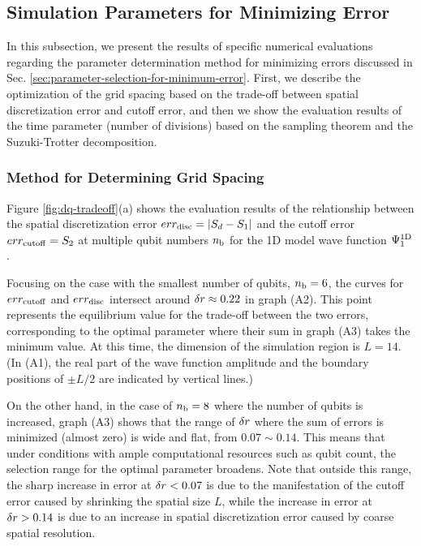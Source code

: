 \documentclass[jctc-draft.tex]{subfiles}
\begin{document}
\subsection{Simulation Parameters for Minimizing Error}
\label{subsec:parameter-selection-for-minimum-error-results}
In this subsection, we present the results of specific numerical evaluations
regarding the parameter determination method for minimizing errors discussed in
Sec. \ref{sec:parameter-selection-for-minimum-error}. First, we describe the
optimization of the grid spacing based on the trade-off between spatial
discretization error and cutoff error, and then we show the evaluation results
of the time parameter (number of divisions) based on the sampling theorem and
the Suzuki-Trotter decomposition.

\subsubsection{Method for Determining Grid Spacing}
\label{subsubsec:delta-r-selection-results}

Figure \ref{fig:dq-tradeoff}(a) shows the evaluation results of the relationship
between the spatial discretization error $err_{\mathrm{disc}} = |S_d-S_1|$ and the cutoff
error $err_{\mathrm{cutoff}} = S_2$ at multiple qubit numbers $n_{\mathrm{b}}$ for the 1D model wave
function $\Psi^{\mathrm{1D}}_1$.

Focusing on the case with the smallest number of qubits, $n_{\mathrm{b}}=6$, the curves for
$err_{\mathrm{cutoff}}$ and $err_{\mathrm{disc}}$ intersect around $\delta r \approx 0.22$ in graph
(A2). This point represents the equilibrium value for the trade-off between the
two errors, corresponding to the optimal parameter where their sum in graph (A3)
takes the minimum value. At this time, the dimension of the simulation region is
$L=14$. (In (A1), the real part of the wave function amplitude and the boundary
positions of $\pm L/2$ are indicated by vertical lines.)

On the other hand, in the case of $n_{\mathrm{b}}=8$ where the number of qubits is
increased, graph (A3) shows that the range of $\delta r$ where the sum of errors
is minimized (almost zero) is wide and flat, from $0.07 \sim 0.14$. This means
that under conditions with ample computational resources such as qubit count,
the selection range for the optimal parameter broadens. Note that outside this
range, the sharp increase in error at $\delta r < 0.07$ is due to the
manifestation of the cutoff error caused by shrinking the spatial size $L$,
while the increase in error at $\delta r > 0.14$ is due to an increase in spatial
discretization error caused by coarse spatial resolution.
\end{document}
